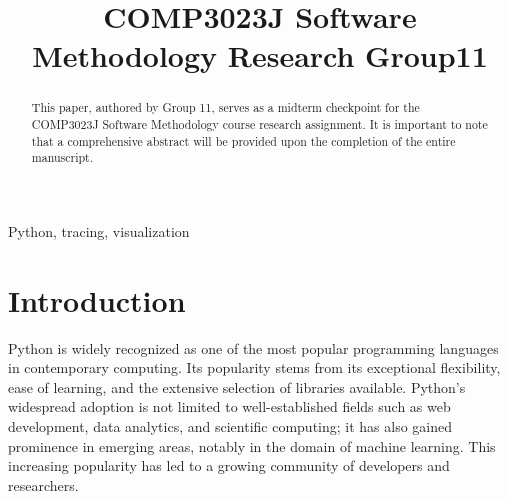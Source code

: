 \documentclass[conference]{IEEEtran}
\begin{document}
\title{COMP3023J Software Methodology Research Group11\\}

\author{
\and
{}
\and
{}
}

\maketitle

\begin{abstract}
This paper, authored by Group 11, serves as a midterm checkpoint for the COMP3023J Software Methodology course research assignment. It is important to note that a comprehensive abstract will be provided upon the completion of the entire manuscript.
\end{abstract}

\begin{IEEEkeywords}
Python, tracing, visualization
\end{IEEEkeywords}

\section{Introduction}
Python is widely recognized as one of the most popular programming languages in contemporary computing. Its popularity stems from its exceptional flexibility, ease of learning, and the extensive selection of libraries available\cite{saabith2019python}. Python's widespread adoption is not limited to well-established fields such as web development, data analytics, and scientific computing; it has also gained prominence in emerging areas, notably in the domain of machine learning\cite{zhang2020python}. This increasing popularity has led to a growing community of developers and researchers.
\end{document}
